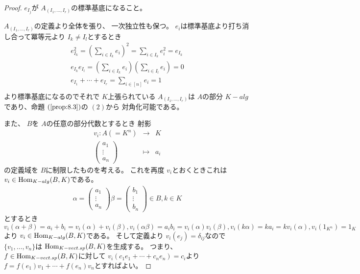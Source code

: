\documentclass[../master_galois_theory]{subfiles}
\begin{document}
\begin{proof}
  $e_{I_j}$が $A_{(I_1 , \dots , I_r)}$の標準基底になること。

  $A_{(I_1 , \dots , I_r)}$の定義より全体を張り、
  一次独立性も保つ。
  $e_i$は標準基底より打ち消し合って冪等元より $I_k \neq I_l$とするとき
  \begin{eqnarray*}
    e_{I_k}^2 = \left( \sum_{i \in I_k} e_i \right)^2 = \sum_{i \in I_k} e_i^2 = e_{I_k} \\
    e_{I_k} e_{I_l} = \left( \sum_{i \in I_k} e_i \right) \left( \sum_{i \in I_l} e_i \right) = 0 \\
    e_{I_1} + \cdots + e_{I_r} = \sum_{i \in [n]} e_i = 1 \\
  \end{eqnarray*}
  より標準基底になるのでそれで $K$上張られている $A_{(I_1 , \dots , I_r)}$は
  $A$の部分 $K-alg$であり、命題 $(\mathrm{\ref{prop:8.3}})$の $(2)$から
  対角化可能である。

  また、 $B$を $A$の任意の部分代数とするとき
  射影
  \begin{eqnarray*}
    v_i : A (= K^n) & \longrightarrow & K \\
    \begin{pmatrix}
      a_1 \\
      \vdots \\
      a_n
    \end{pmatrix}
    & \longmapsto & a_i
  \end{eqnarray*}
  の定義域を $B$に制限したものを考える。
  これを再度 $v_i$とおくときこれは $v_i \in \mathrm{Hom}_{K-alg}(B,K)$である。
  \begin{eqnarray*}
    \alpha =
    \begin{pmatrix}
      a_1 \\
      \vdots \\
      a_n
    \end{pmatrix}
    \beta =
    \begin{pmatrix}
      b_1 \\
      \vdots \\
      b_n
    \end{pmatrix}
    \in B ,
    k \in K
  \end{eqnarray*}
  とするとき
  $v_i (\alpha + \beta) = a_i + b_i = v_i (\alpha) + v_i (\beta) ,
  v_i (\alpha \beta) = a_i b_i = v_i (\alpha) v_i (\beta) ,
  v_i (k \alpha) = k a_i = k v_i (\alpha) ,
  v_i (1_{K^n}) = 1_K$
  より $v_i \in \mathrm{Hom}_{K-alg}(B,K)$である。
  そして定義より $v_i(e_j) = \delta_{ij}$なので
  $\{ v_1 , \dots , v_n \}$は $\mathrm{Hom}_{K-vect.sp}(B,K)$を生成する。
  つまり、 $f \in \mathrm{Hom}_{K-vect.sp}(B,K)$に対して
  $v_i (c_1 e_1 + \cdots + c_n e_n) = c_i$より
  $f = f(e_1)v_1 + \cdots + f(e_n)v_n$とすればよい。


\end{proof}
\end{document}
